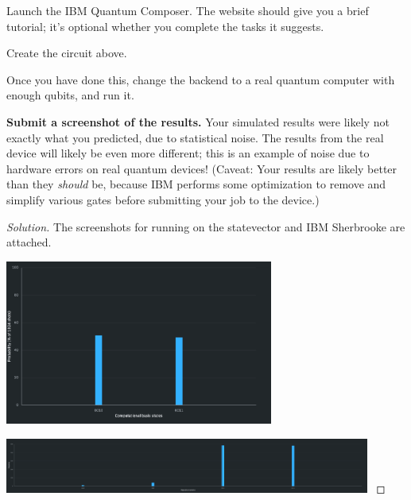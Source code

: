 \begin{solution}[label=ques:3f]
  \begin{question}
    Launch the IBM Quantum Composer.  The website should give you a brief tutorial; it's optional whether you complete the tasks it suggests. 

Create the circuit above.

Once you have done this, change the backend to a real quantum computer with enough qubits, and run it.

\textbf{Submit a screenshot of the results.} Your simulated results were likely not exactly what you predicted, due to statistical noise. The results from the real device will likely be even more different; this is an example of noise due to hardware errors on real quantum devices! 
(Caveat: Your results are likely better than they \textit{should} be, because IBM performs some optimization to remove and simplify various gates before submitting your job to the device.)
  \end{question}
  \tcblower{}
  \begin{proof}[Solution]
    The screenshots for running on the statevector and IBM Sherbrooke are attached.\par
    \begin{minipage}[t]{\textwidth}
      \centering
      \includegraphics[width=0.66\textwidth]{q3_f_sv.png}
      \label{fig:3f_sv}
    \end{minipage}

    \begin{minipage}[t]{\textwidth}
      \centering
      \includegraphics[width=0.9\textwidth]{q3_f_sherbrooke.png}
      \label{fig:3f_sb}
    \end{minipage}
    
  \end{proof}
\end{solution}

